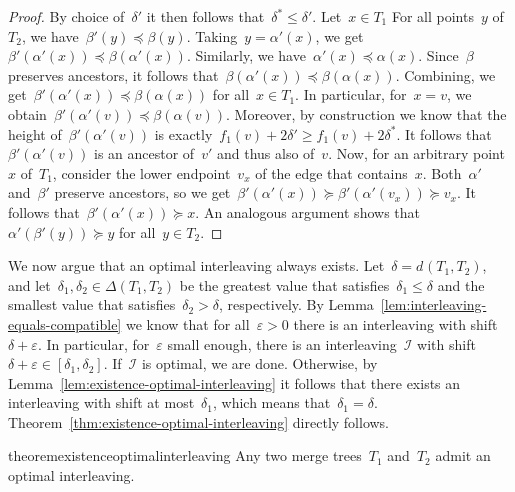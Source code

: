 \documentclass[11pt]{article}
\newcommand{\intdist}[1]{d^{{#1}}}
\newcommand{\eps}{\varepsilon}
\newcommand{\I}{\mathcal{I}}
\begin{document}
\begin{proof}
	By choice of~$\delta'$ it then follows that~$\delta^* \le \delta'$.
    Let~$x \in T_1$
    For all points~$y$ of~$T_2$, we have~$\beta'(y) \preceq \beta(y)$.
    Taking~$y = \alpha'(x)$, we get~$\beta'(\alpha'(x)) \preceq \beta(\alpha'(x))$.
    Similarly, we have~$\alpha'(x) \preceq \alpha(x)$.
    Since~$\beta$ preserves ancestors, it follows that~$\beta(\alpha'(x)) \preceq \beta(\alpha(x))$.
    Combining, we get~$\beta'(\alpha'(x)) \preceq \beta(\alpha(x))$ for all~$x \in T_1$.
	In particular, for~$x = v$, we obtain~$\beta'(\alpha'(v)) \preceq \beta(\alpha(v))$.
	Moreover, by construction we know that the height of~$\beta'(\alpha'(v))$ is exactly~$f_1(v) + 2\delta' \ge f_1(v) + 2\delta^*$.
	It follows that~$\beta'(\alpha'(v))$ is an ancestor of~$v'$ and thus also of~$v$.
	Now, for an arbitrary point~$x$ of~$T_1$, consider the lower endpoint~$v_x$ of the edge that contains~$x$.
	Both~$\alpha'$ and~$\beta'$ preserve ancestors, so we get~$\beta'(\alpha'(x)) \succeq \beta'(\alpha'(v_x)) \succeq v_x$. 
	It follows that~$\beta'(\alpha'(x)) \succeq x$.
	An analogous argument shows that $\alpha'(\beta'(y)) \succeq y$ for all~$y \in T_2$.
\end{proof}
%
\noindent
We now argue that an optimal interleaving always exists.
Let~$\delta = \intdist{}(T_1, T_2)$, and let~$\delta_1, \delta_2 \in \Delta(T_1, T_2)$ be the greatest value that satisfies~$\delta_1 \le \delta$ and the smallest value that satisfies~$\delta_2 > \delta$, respectively.
By Lemma~\ref{lem:interleaving-equals-compatible} we know that for all~$\eps > 0$ there is an interleaving with shift~$\delta + \eps$.
In particular, for~$\eps$ small enough, there is an interleaving~$\I$ with shift~$\delta + \eps \in [\delta_1, \delta_2]$.
If~$\I$ is optimal, we are done.
Otherwise, by Lemma~\ref{lem:existence-optimal-interleaving} it follows that there exists an interleaving with shift at most~$\delta_1$, which means that~$\delta_1 = \delta$.
Theorem~\ref{thm:existence-optimal-interleaving} directly follows.
%
\begin{restatable}{theorem}{existenceoptimalinterleaving}
\label{thm:existence-optimal-interleaving}
	Any two merge trees~$T_1$ and~$T_2$ admit an optimal interleaving.
\end{restatable}
%
\end{document}
